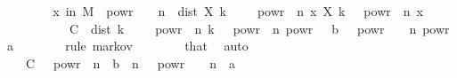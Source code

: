 \begin{isabellebody}
\ {\isacharminus}{\kern0pt}\isanewline
\ \ \ \ \isamarkupfalse%
\ {\isachardoublequoteopen}{\isasymP}{\isacharparenleft}{\kern0pt}x\ in\ {\isacharquery}{\kern0pt}M{\isachardot}{\kern0pt}\ {}\ powr\ {\isacharparenleft}{\kern0pt}{\isacharminus}{\kern0pt}\ {\isasymgamma}\ {\isacharasterisk}{\kern0pt}\ n{\isacharparenright}{\kern0pt}\ {\isasymle}\ dist\ {\isacharparenleft}{\kern0pt}X\ {\isacharparenleft}{\kern0pt}{\isacharparenleft}{\kern0pt}k\ {\isacharminus}{\kern0pt}\ {}{\isacharparenright}{\kern0pt}\ {\isacharasterisk}{\kern0pt}\ {}\ powr\ {\isacharminus}{\kern0pt}\ n{\isacharparenright}{\kern0pt}\ x{\isacharparenright}{\kern0pt}\ {\isacharparenleft}{\kern0pt}X\ {\isacharparenleft}{\kern0pt}k\ {\isacharasterisk}{\kern0pt}\ {}\ powr\ {\isacharminus}{\kern0pt}\ n{\isacharparenright}{\kern0pt}\ x{\isacharparenright}{\kern0pt}{\isacharparenright}{\kern0pt}\isanewline
\ \ \ \ \ \ \ \ \ {\isasymle}\ C\ {\isacharasterisk}{\kern0pt}\ dist\ {\isacharparenleft}{\kern0pt}{\isacharparenleft}{\kern0pt}k\ {\isacharminus}{\kern0pt}\ {}{\isacharparenright}{\kern0pt}\ {\isacharasterisk}{\kern0pt}\ {}\ powr\ {\isacharminus}{\kern0pt}\ n{\isacharparenright}{\kern0pt}\ {\isacharparenleft}{\kern0pt}k\ {\isacharasterisk}{\kern0pt}\ {}\ powr\ {\isacharminus}{\kern0pt}\ n{\isacharparenright}{\kern0pt}\ powr\ {\isacharparenleft}{\kern0pt}{}\ {\isacharplus}{\kern0pt}\ b{\isacharparenright}{\kern0pt}\ {\isacharslash}{\kern0pt}\ {\isacharparenleft}{\kern0pt}{}\ powr\ {\isacharparenleft}{\kern0pt}{\isacharminus}{\kern0pt}\ {\isasymgamma}\ {\isacharasterisk}{\kern0pt}\ n{\isacharparenright}{\kern0pt}{\isacharparenright}{\kern0pt}\ powr\ a{\isachardoublequoteclose}\isanewline
\ \ \ \ \ \ \isamarkupfalse%
\ {\isacharparenleft}{\kern0pt}rule\ markov{\isacharparenright}{\kern0pt}\isanewline
\ \ \ \ \ \ \isamarkupfalse%
\ that\ \isamarkupfalse%
\ auto\isanewline
\ \ \ \ \isamarkupfalse%
\ \isamarkupfalse%
\ {\isachardoublequoteopen}{\isachardot}{\kern0pt}{\isachardot}{\kern0pt}{\isachardot}{\kern0pt}\ {\isacharequal}{\kern0pt}\ C\ {\isacharasterisk}{\kern0pt}\ {}\ powr\ {\isacharparenleft}{\kern0pt}{\isacharminus}{\kern0pt}\ n\ {\isacharminus}{\kern0pt}\ b\ {\isacharasterisk}{\kern0pt}\ n{\isacharparenright}{\kern0pt}\ {\isacharslash}{\kern0pt}\ {}\ powr\ {\isacharparenleft}{\kern0pt}{\isacharminus}{\kern0pt}\ {\isasymgamma}\ {\isacharasterisk}{\kern0pt}\ n\ {\isacharasterisk}{\kern0pt}\ a{\isacharparenright}{\kern0pt}{\isachardoublequoteclose}\isanewline

\end{isabellebody}
